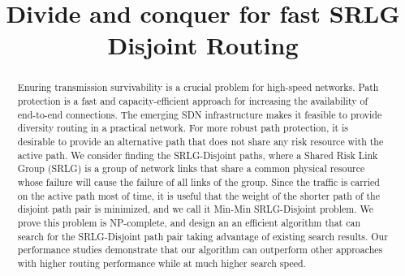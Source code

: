 \documentclass[10pt,journal,letterpaper]{IEEEtran}
\begin{document}
\title{Divide and conquer for fast SRLG Disjoint Routing}

\maketitle
\vspace{-3em}
\begin{abstract}
    Enuring transmission survivability is a crucial problem for high-speed networks. Path protection is a fast and capacity-efficient approach for increasing the availability of end-to-end connections. The emerging SDN infrastructure makes it feasible to provide diversity routing in a practical network. For more robust path protection, it is desirable to provide an alternative path that does not share any risk resource with the active path. We consider finding the SRLG-Disjoint paths, where a Shared Risk Link Group (SRLG) is a group of network links that share a common physical resource whose failure will cause the failure of all links of the group.
     Since the traffic is carried on the active path most of time, it is useful that the weight of the shorter path of the disjoint path pair is minimized, and we call it  Min-Min SRLG-Disjoint problem. We prove this problem is NP-complete, and design an an efficient algorithm that can search for the SRLG-Disjoint path pair taking advantage of existing search results. Our performance studies demonstrate that our algorithm can outperform other approaches with higher routing performance while at much higher search speed.

\end{abstract}









\end{document}
